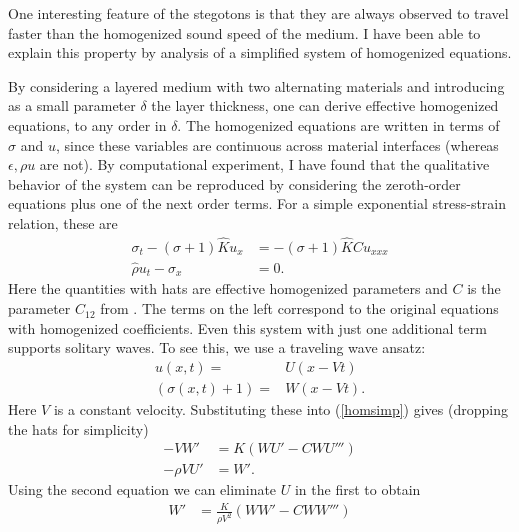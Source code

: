 One interesting feature of the stegotons is that they are always observed
to travel faster than the homogenized sound speed of the medium.
I have been able to explain this property by analysis of a simplified 
system of homogenized equations.  

By considering a layered medium with two alternating materials and
introducing as a small parameter $\delta$ the layer thickness, one can derive
effective homogenized equations, to any order in $\delta$.  The 
homogenized equations are written in terms of $\sigma$ and $u$, since
these variables are continuous across material interfaces (whereas 
$\epsilon,\rho u$ are not).  By computational
experiment, I have found that the qualitative behavior of the system
can be reproduced by considering the zeroth-order equations plus one of
the next order terms.  For a simple exponential stress-strain relation,
these are
\begin{subequations}
\label{homsimp}
\begin{align}
\sigma_t-(\sigma+1)\hat{K}u_x & = -(\sigma+1)\hat{K}Cu_{xxx} \\
\hat{\rho} u_t - \sigma_x & = 0.
\end{align}
\end{subequations}
Here the quantities with hats are effective homogenized parameters
and $C$ is the parameter $C_{12}$ from \cite{leveque2003}.
The terms on the left correspond to the original equations with 
homogenized coefficients.  Even this system with just one additional
term supports solitary waves.  To see this, we use a traveling wave
ansatz: 
\begin{subequations}
\begin{align}
u(x,t) = & U(x-Vt) \\
(\sigma(x,t)+1) = & W(x-Vt).
\end{align}
\end{subequations}
Here $V$ is a constant velocity.  Substituting these into (\ref{homsimp})
gives (dropping the hats for simplicity)
\begin{subequations}
\begin{align}
-VW' & = K(WU'-CWU''') \\
-\rho V U' & = W'.
\end{align}
\end{subequations}
Using the second equation we can eliminate $U$ in the first to obtain
\begin{subequations}
\begin{align}
W' & = \frac{K}{\rho V^2}(WW'-CWW''')
\end{align}
\end{subequations}
